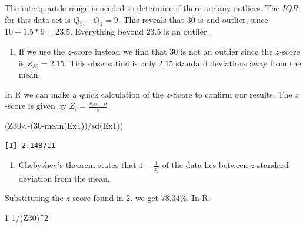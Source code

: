 \documentclass[
  letterpaper,
  DIV=11,
  numbers=noendperiod]{scrreprt}
\newenvironment{Shaded}{\begin{snugshade}}{\end{snugshade}}
\newcommand{\DecValTok}[1]{\textcolor[rgb]{0.68,0.00,0.00}{#1}}
\newcommand{\FunctionTok}[1]{\textcolor[rgb]{0.28,0.35,0.67}{#1}}
\newcommand{\NormalTok}[1]{\textcolor[rgb]{0.00,0.23,0.31}{#1}}
\newcommand{\OtherTok}[1]{\textcolor[rgb]{0.00,0.23,0.31}{#1}}
\newcommand{\SpecialCharTok}[1]{\textcolor[rgb]{0.37,0.37,0.37}{#1}}
\providecommand{\tightlist}{%
  \setlength{\itemsep}{0pt}\setlength{\parskip}{0pt}}\usepackage{longtable,booktabs,array}
\begin{document}
The interquartile range is needed to determine if there are any
outliers. The \(IQR\) for this data set is \(Q_{3}-Q_{1}=9\). This
reveals that \(30\) is and outlier, since \(10+1.5*9=23.5\). Everything
beyond \(23.5\) is an outlier.

\begin{blackbox}

\begin{enumerate}
\def\labelenumi{\arabic{enumi}.}
\setcounter{enumi}{1}
\tightlist
\item
  If we use the \(z\)-score instead we find that \(30\) is not an
  outlier since the \(z\)-score is \(Z_{30}=2.15\). This observation is
  only \(2.15\) standard deviations away from the mean.
\end{enumerate}

\end{blackbox}

In R we can make a quick calculation of the \(z\)-Score to confirm our
results. The \(z\)-score is given by
\(Z_{i}=\frac{x_{30}-\mu}{\sigma}\).

\begin{Shaded}
\begin{Highlighting}[numbers=left,,]
\NormalTok{(Z30}\OtherTok{\textless{}{-}}\NormalTok{(}\DecValTok{30}\SpecialCharTok{{-}}\FunctionTok{mean}\NormalTok{(Ex1))}\SpecialCharTok{/}\FunctionTok{sd}\NormalTok{(Ex1))}
\end{Highlighting}
\end{Shaded}

\begin{verbatim}
[1] 2.148711
\end{verbatim}

\begin{blackbox}

\begin{enumerate}
\def\labelenumi{\arabic{enumi}.}
\setcounter{enumi}{2}
\tightlist
\item
  Chebyshev's theorem states that \(1-\frac{1}{z_{2}}\) of the data lies
  between \(z\) standard deviation from the mean.
\end{enumerate}

\end{blackbox}

Substituting the \(z\)-score found in 2. we get \(78.34\)\%. In R:

\begin{Shaded}
\begin{Highlighting}[numbers=left,,]
\DecValTok{1{-}1}\SpecialCharTok{/}\NormalTok{(Z30)}\SpecialCharTok{\^{}}\DecValTok{2}
\end{Highlighting}
\end{Shaded}
\end{document}
